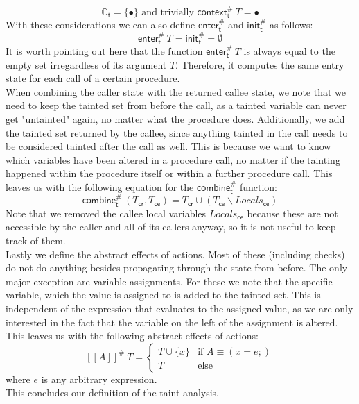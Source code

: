       \[\mathbb{C}_\textsf{t} = \{\bullet\} \text{ and trivially } \textsf{context}^{\#}_\textsf{t}\ T = \bullet\]
      With these considerations we can also define $\textsf{enter}^{\#}_\textsf{t}$ and $\textsf{init}^{\#}_\textsf{t}$ as follows:
      \[\textsf{enter}^{\#}_\textsf{t}\ T = \textsf{init}^{\#}_\textsf{t} = \emptyset\]
      It is worth pointing out here that the function $\textsf{enter}^{\#}_\textsf{t}\ T$ is always equal to the empty set irregardless of its argument $T$. Therefore, it computes the same entry state for each call of a certain procedure.\\
      When combining the caller state with the returned callee state, we note that we need to keep the tainted set from before the call, as a tainted variable can never get "untainted" again, no matter what the procedure does. Additionally, we add the tainted set returned by the callee, since anything tainted in the call needs to be considered tainted after the call as well. This is because we want to know which variables have been altered in a procedure call, no matter if the tainting happened within the procedure itself or within a further procedure call. This leaves us with the following equation for the $\textsf{combine}^{\#}_\textsf{t}$ function:
      \[ \textsf{combine}^{\#}_\textsf{t}\ (T_\textsf{cr}, T_\textsf{ce}) = T_\textsf{cr} \cup (T_\textsf{ce} \backslash Locals_\textsf{ce}) \]
      Note that we removed the callee local variables $Locals_\textsf{ce}$ because these are not accessible by the caller and all of its callers anyway, so it is not useful to keep track of them.\\
      Lastly we define the abstract effects of actions. Most of these (including checks) do not do anything besides propagating through the state from before. The only major exception are variable assignments. For these we note that the specific variable, which the value is assigned to is added to the tainted set. This is independent of the expression that evaluates to the assigned value, as we are only interested in the fact that the variable on the left of the assignment is altered. This leaves us with the following abstract effects of actions:
      \[ [\![ A ]\!] ^{\#}\ T = \left\{ \begin{array}{ll}
        T \cup \{x\} & \text{if }A \equiv (x = e;)\\
        T & \text{else}
      \end{array} \right. \]
      where $e$ is any arbitrary expression.\\
      This concludes our definition of the taint analysis.

